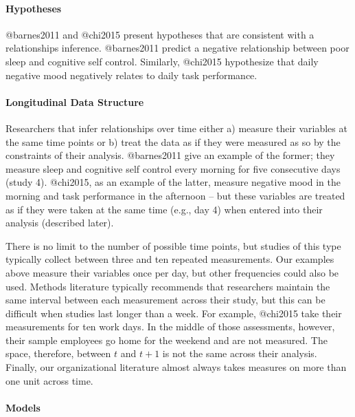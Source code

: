 \documentclass[]{article}
\let\oldparagraph\paragraph
\renewcommand{\paragraph}[1]{\oldparagraph{#1}\mbox{}}
\begin{document}
\hypertarget{hypotheses}{%
\paragraph{Hypotheses}\label{hypotheses}}

@barnes2011 and @chi2015 present hypotheses that are consistent with a
relationships inference. @barnes2011 predict a negative relationship
between poor sleep and cognitive self control. Similarly, @chi2015
hypothesize that daily negative mood negatively relates to daily task
performance.

\hypertarget{longitudinal-data-structure}{%
\paragraph{Longitudinal Data
Structure}\label{longitudinal-data-structure}}

Researchers that infer relationships over time either a) measure their
variables at the same time points or b) treat the data as if they were
measured as so by the constraints of their analysis. @barnes2011 give an
example of the former; they measure sleep and cognitive self control
every morning for five consecutive days (study 4). @chi2015, as an
example of the latter, measure negative mood in the morning and task
performance in the afternoon -- but these variables are treated as if
they were taken at the same time (e.g., day 4) when entered into their
analysis (described later).

There is no limit to the number of possible time points, but studies of
this type typically collect between three and ten repeated measurements.
Our examples above measure their variables once per day, but other
frequencies could also be used. Methods literature typically recommends
that researchers maintain the same interval between each measurement
across their study, but this can be difficult when studies last longer
than a week. For example, @chi2015 take their measurements for ten work
days. In the middle of those assessments, however, their sample
employees go home for the weekend and are not measured. The space,
therefore, between \(t\) and \(t + 1\) is not the same across their
analysis. Finally, our organizational literature almost always takes
measures on more than one unit across time.

\hypertarget{models}{%
\paragraph{Models}\label{models}}
\end{document}

